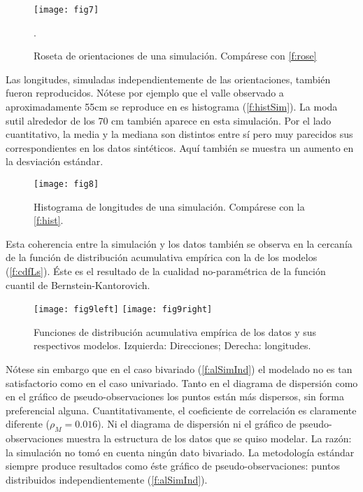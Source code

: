 
\begin{figure}
	\centering
	\texttt{[image: fig7]}
	\caption{Roseta de orientaciones de una simulaci\'on. Comp\'arese con \autoref{f:rose}}.
	\label{f:roseSim}
\end{figure}



Las longitudes, simuladas independientemente de las orientaciones, tambi\'en fueron reproducidos. N\'otese por ejemplo que el valle observado a aproximadamente 55cm se reproduce en es histograma (\autoref{f:histSim}). La moda sutil alrededor de los 70 cm tambi\'en aparece en esta simulaci\'on. Por el lado cuantitativo, la media y la mediana son distintos entre s\'i pero muy parecidos sus correspondientes en los datos sint\'eticos. Aqu\'i tambi\'en se muestra un aumento en la desviaci\'on est\'andar.

\begin{figure}
	\centering
	\texttt{[image: fig8]}
	\caption{Histograma de longitudes de una simulaci\'on. Comp\'arese con la \autoref{f:hist}.}
	\label{f:histSim}
\end{figure}



Esta coherencia entre la simulaci\'on y los datos tambi\'en se observa en la cercan\'ia de la funci\'on de distribuci\'on acumulativa emp\'irica con la de los modelos (\autoref{f:cdfLs}). \'Este es el resultado de la cualidad no-param\'etrica de la funci\'on cuantil de Bernstein-Kantorovich.

\begin{figure}[H]
	\centering
	\texttt{[image: fig9left]}
	\qquad
	\texttt{[image: fig9right]}
	\caption{Funciones de distribuci\'on acumulativa emp\'irica de los datos y sus respectivos modelos. Izquierda: Direcciones; Derecha: longitudes.}
	\label{f:cdfLs}
\end{figure}

N\'otese sin embargo que en el caso bivariado (\autoref{f:alSimInd}) el modelado no es tan satisfactorio como en el caso univariado.
Tanto en el diagrama de dispersi\'on como en el gr\'afico de pseudo-observaciones los puntos est\'an m\'as dispersos, sin forma preferencial alguna.
Cuantitativamente, el coeficiente de correlaci\'on es claramente diferente ($\rho_M = 0.016$).
Ni el diagrama de dispersi\'on ni el gr\'afico de pseudo-observaciones muestra la estructura de los datos que se quiso modelar. La raz\'on: la simulaci\'on no tom\'o en cuenta ning\'un dato bivariado. La metodolog\'ia est\'andar siempre produce resultados como \'este gr\'afico de pseudo-observaciones: puntos distribuidos independientemente (\autoref{f:alSimInd}).

